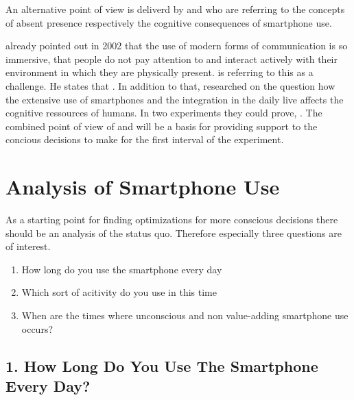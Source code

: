 \documentclass[11pt,letterpaper]{article}
\begin{document}
An alternative point of view is deliverd by \cite{gergen02} and \cite{ward17} who are referring to the concepts of absent presence respectively the cognitive consequences of smartphone use.
\begin{center}
 \autocite[][p.227]{gergen02}
\end{center}
\cite{gergen02} already pointed out in 2002 that the use of modern forms of communication is so immersive, that people do not pay attention to and interact actively with their environment in which they are physically present. \cite{gergen02} is referring to this as a challenge. He states that \autocite[][p.236]{gergen02}. In addition to that, \cite{ward17} researched on the question how the extensive use of smartphones and the integration in the daily live affects the cognitive ressources of humans. In two experiments they could prove,  \autocite[][]{ward17}. The combined point of view of \cite{gergen02} and \cite{ward17} will be a basis for providing support to the concious decisions to make for the first interval of the experiment.


\section*{Analysis of Smartphone Use}
As a starting point for finding optimizations for more conscious decisions there should be an analysis of the status quo. Therefore especially three questions are of interest. 
\begin{enumerate}
\item How long do you use the smartphone every day
\item Which sort of acitivity do you use in this time
\item When are the times where unconscious and non value-adding smartphone use occurs?
\end{enumerate}

\subsection*{1. How Long Do You Use The Smartphone Every Day?}
\end{document}
